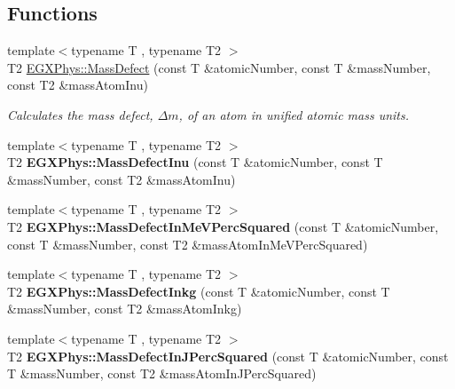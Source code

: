 \subsection*{Functions}
\begin{DoxyCompactItemize}
\item 
{\footnotesize template$<$typename T , typename T2 $>$ }\\T2 \hyperlink{group___e_g_x_phys_gae89f2dfa65992c0314adc2440b2f582a}{E\+G\+X\+Phys\+::\+Mass\+Defect} (const T \&atomic\+Number, const T \&mass\+Number, const T2 \&mass\+Atom\+Inu)
\begin{DoxyCompactList}\small\item\em Calculates the mass defect, $\Delta m$, of an atom in unified atomic mass units. \end{DoxyCompactList}\item 
\mbox{\label{group___e_g_x_phys_ga70400004a5cb622de372ab84670731ef}} 
{\footnotesize template$<$typename T , typename T2 $>$ }\\T2 {\bfseries E\+G\+X\+Phys\+::\+Mass\+Defect\+Inu} (const T \&atomic\+Number, const T \&mass\+Number, const T2 \&mass\+Atom\+Inu)
\item 
\mbox{\label{group___e_g_x_phys_gab51169bf871d0ea0ee0642fa300228fe}} 
{\footnotesize template$<$typename T , typename T2 $>$ }\\T2 {\bfseries E\+G\+X\+Phys\+::\+Mass\+Defect\+In\+Me\+V\+Perc\+Squared} (const T \&atomic\+Number, const T \&mass\+Number, const T2 \&mass\+Atom\+In\+Me\+V\+Perc\+Squared)
\item 
\mbox{\label{group___e_g_x_phys_gad5378933021e13598a76bd8581b1e887}} 
{\footnotesize template$<$typename T , typename T2 $>$ }\\T2 {\bfseries E\+G\+X\+Phys\+::\+Mass\+Defect\+Inkg} (const T \&atomic\+Number, const T \&mass\+Number, const T2 \&mass\+Atom\+Inkg)
\item 
\mbox{\label{group___e_g_x_phys_ga08cff1dfa3259af8f1b67ec741796e91}} 
{\footnotesize template$<$typename T , typename T2 $>$ }\\T2 {\bfseries E\+G\+X\+Phys\+::\+Mass\+Defect\+In\+J\+Perc\+Squared} (const T \&atomic\+Number, const T \&mass\+Number, const T2 \&mass\+Atom\+In\+J\+Perc\+Squared)
\end{DoxyCompactItemize}


